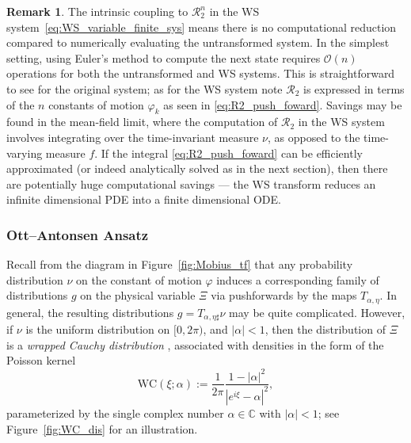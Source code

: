 \documentclass[10pt]{article}
\theoremstyle{definition}
\theoremstyle{definition}
\newtheorem{remark}[theorem]{Remark}
\numberwithin{equation}{section}
\newcommand{\BBC}{\mathbb{C}}
\newcommand{\CR}{\mathcal{R}}
\renewcommand{\S}{\mathbb{S}}
\newcommand{\WC}{\mathrm{WC}}
\begin{document}
\begin{remark}
    The intrinsic coupling to $\CR_2^n$ in the WS system~\eqref{eq:WS_variable_finite_sys} means there is no computational reduction compared to numerically evaluating the untransformed system.  In the simplest setting, using Euler's method to compute the next state requires $\mathcal{O}(n)$ operations for both the untransformed and WS systems.  This is straightforward to see for the original system; as for the WS system note $\CR_2$ is expressed in terms of the $n$ constants of motion $\varphi_k$ as seen in \eqref{eq:R2_push_foward}.  Savings may be found in the mean-field limit, where the computation of $\CR_2$ in the WS system involves integrating over the time-invariant measure  $\nu$, as opposed to the time-varying measure $f$.  If the integral \eqref{eq:R2_push_foward} can be efficiently approximated (or indeed analytically solved as in the next section), then there are potentially huge computational savings --- the WS transform reduces an infinite dimensional PDE into a finite dimensional ODE.  
    
\end{remark}

\subsubsection{Ott--Antonsen Ansatz}\label{subsec:OA}


Recall from the diagram in Figure~\ref{fig:Mobius_tf} that any probability distribution $\nu$ on the constant of motion $\varphi$ induces a corresponding family of distributions $g$ on the physical variable $\Xi$ via pushforwards by the maps $T_{\alpha, \eta}$.
In general, the resulting distributions $g=T_{\alpha, \eta\sharp} \nu$ may be quite complicated.
However, if $\nu$ is the uniform distribution on $[0, 2\pi)$, and $|\alpha|<1$, then the distribution of $\Xi$ is a \emph{wrapped Cauchy distribution} \cite{mardia2009directional}, associated with densities in the form of the Poisson kernel
\begin{equation}\label{eq:WC_dis}
    \WC (\xi; \alpha)
    := \frac{1}{2\pi} \frac{1 - |\alpha|^2}{|e^{i\xi} - \alpha|^2},
\end{equation}
parameterized by the single complex number $\alpha \in \BBC$ with $|\alpha|<1$; see Figure~\ref{fig:WC_dis} for an illustration. 
\end{document}
